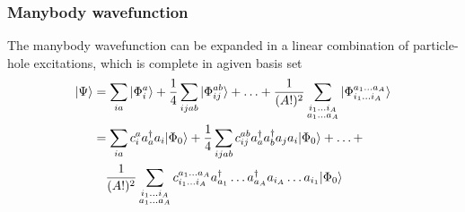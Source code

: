 \begin{frame}[fragile]
    \frametitle{Manybody wavefunction}
    
    The manybody wavefunction can be expanded in a linear combination of particle-hole excitations, which is complete in agiven basis set
    \begin{align*}
        |\Psi\rangle &= \sum_{ia} |\Phi_i^a\rangle + \frac{1}{4} \sum_{ijab} |\Phi_{ij}^{ab}\rangle + \ldots +
            \frac{1}{(A!)^2} \sum_{\substack{ i_1 \ldots i_A \\ a_1 \ldots a_A}} 
            |\Phi_{i_1 \ldots i_A}^{a_1 \ldots a_A}\rangle \notag \\
        &= \sum_{ia} c_i^a a_a^\dagger a_i |\Phi_0\rangle + 
            \frac{1}{4} \sum_{ijab} c_{ij}^{ab} a_a^\dagger a_b^\dagger a_j a_i |\Phi_0\rangle + \ldots + \notag \\
        & \quad     \frac{1}{(A!)^2} \sum_{\substack{ i_1 \ldots i_A \\ a_1 \ldots a_A}} 
        c_{i_1 \ldots i_A}^{a_1 \ldots a_A} a_{a_1}^\dagger \ldots a_{a_A}^\dagger a_{i_A} \ldots a_{i_1} |\Phi_0\rangle
    \end{align*}
\end{frame}
